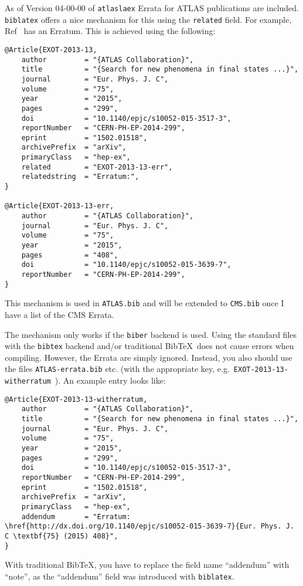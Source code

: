 \documentclass[UKenglish, texlive=2016]{\ATLASLATEXPATH atlasdoc}
\newcommand*{\BibTeX}{Bib\TeX}
\newcommand{\Package}[1]{\texttt{#1}\xspace}
\begin{document}
As of Version 04-00-00 of \Package{atlaslaex} Errata for ATLAS publications are included.
\Package{biblatex} offers a nice mechanism for this using the \texttt{related} field.
For example, Ref~\cite{EXOT-2013-13} has an Erratum.
This is achieved using the following:
\begin{verbatim}
@Article{EXOT-2013-13,
    author         = "{ATLAS Collaboration}",
    title          = "{Search for new phenomena in final states ...}",
    journal        = "Eur. Phys. J. C",
    volume         = "75",
    year           = "2015",
    pages          = "299",
    doi            = "10.1140/epjc/s10052-015-3517-3",
    reportNumber   = "CERN-PH-EP-2014-299",
    eprint         = "1502.01518",
    archivePrefix  = "arXiv",
    primaryClass   = "hep-ex",
    related        = "EXOT-2013-13-err",
    relatedstring  = "Erratum:",
}

@Article{EXOT-2013-13-err,
    author         = "{ATLAS Collaboration}",
    journal        = "Eur. Phys. J. C",
    volume         = "75",
    year           = "2015",
    pages          = "408",
    doi            = "10.1140/epjc/s10052-015-3639-7",
    reportNumber   = "CERN-PH-EP-2014-299",
}
\end{verbatim}

This mechanism is used in \texttt{ATLAS.bib} and will be extended to \texttt{CMS.bib} once
I have a list of the CMS Errata.

The mechanism only works if the \texttt{biber} backend is used.
Using the standard files with the \texttt{bibtex} backend and/or traditional \BibTeX\ does not cause errors when compiling.
However, the Errata are simply ignored.
Instead, you also should use the files \texttt{ATLAS-errata.bib} etc.
(with the appropriate key, e.g.~\texttt{EXOT-2013-13-witherratum}~\cite{EXOT-2013-13-witherratum}).
An example entry looks like:
\begin{verbatim}
@Article{EXOT-2013-13-witherratum,
    author         = "{ATLAS Collaboration}",
    title          = "{Search for new phenomena in final states ...}",
    journal        = "Eur. Phys. J. C",
    volume         = "75",
    year           = "2015",
    pages          = "299",
    doi            = "10.1140/epjc/s10052-015-3517-3",
    reportNumber   = "CERN-PH-EP-2014-299",
    eprint         = "1502.01518",
    archivePrefix  = "arXiv",
    primaryClass   = "hep-ex",
    addendum       = "Erratum: \href{http://dx.doi.org/10.1140/epjc/s10052-015-3639-7}{Eur. Phys. J. C \textbf{75} (2015) 408}",
}
\end{verbatim}
With traditional \BibTeX, you have to replace the field name \enquote{addendum} with \enquote{note},
as the \enquote{addendum} field was introduced with \Package{biblatex}.
\end{document}
